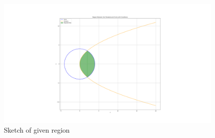 \documentclass[journal]{IEEEtran}
\begin{document}
\begin{figure}[h!]
   \centering
   \includegraphics[width = 1\linewidth]{figs/fig.png}
   \caption{Sketch of given region}
   \label{stemplot}
\end{figure}
\end{document}
